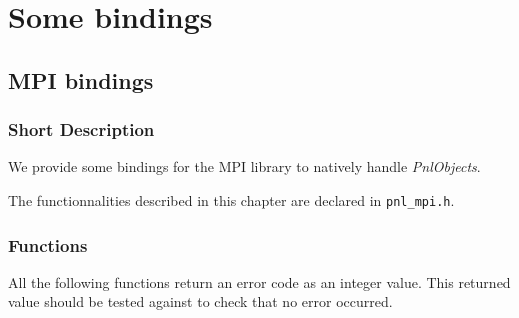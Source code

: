 \section{Some bindings}

\subsection{MPI bindings}
\subsubsection{Short Description}

We provide some bindings for the MPI library to natively handle {\it PnlObjects}.

The functionnalities described in this chapter are declared in \verb!pnl_mpi.h!.

\subsubsection{Functions}

All the following functions return an error code as an integer value. This
returned value should be tested against  to check that no
error occurred.

